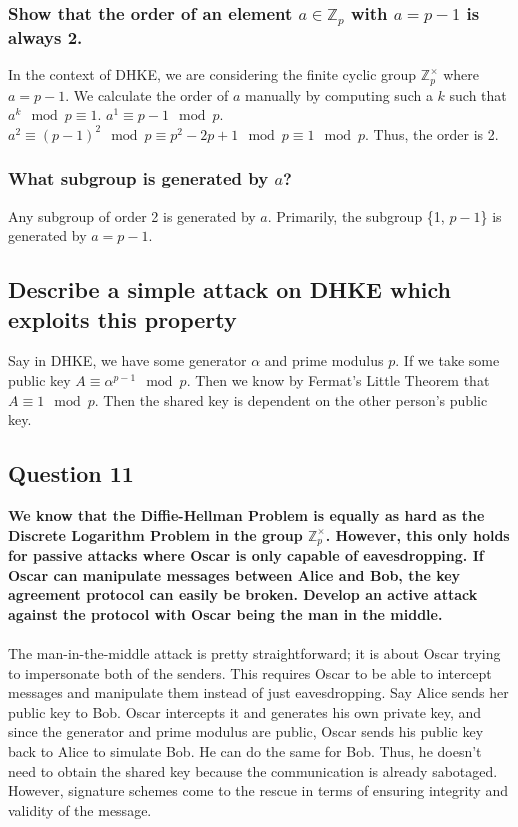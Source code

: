 \documentclass[titlepage]{article}
\begin{document}
{{\subsubsection{Show that the order of an element \(a \in \mathbb{Z}_p\) with \(a = p - 1\) is always 2.}
{
In the context of DHKE, we are considering the finite cyclic group \(\mathbb{Z}_p^{\times}\) where \(a = p -1\). We calculate the order of \(a\) manually by computing such a \(k\) such that \(a^k \mod p \equiv 1\). \(a^1 \equiv p - 1 \mod p\). \(a^2 \equiv (p - 1)^2 \mod p \equiv p^2 - 2p + 1 \mod p \equiv 1 \mod p\). Thus, the order is 2. 
}
\subsubsection{What subgroup is generated by \(a\)?}
{
Any subgroup of order 2 is generated by \(a\). Primarily, the subgroup \{1, \(p - 1\)\} is generated by \(a = p - 1\).
}
\subsection{Describe a simple attack on DHKE which exploits this property}
{
Say in DHKE, we have some generator \(\alpha\) and prime modulus \(p\). If we take some public key \(A \equiv \alpha^{p - 1} \mod p\). Then we know by Fermat's Little Theorem that \(A \equiv 1 \mod p\). Then the shared key is dependent on the other person's public key. 
}
}
\clearpage
\subsection{Question 11}
{
\textbf{We know that the Diffie-Hellman Problem is equally as hard as the Discrete Logarithm Problem in the group \(\mathbb{Z}_{p}^{\times}\). However, this only holds for passive attacks where Oscar is only capable of eavesdropping. If Oscar can manipulate messages between Alice and Bob, the key agreement protocol can easily be broken. Develop an active attack against the protocol with Oscar being the man in the middle.}\\\\
The man-in-the-middle attack is pretty straightforward; it is about Oscar trying to impersonate both of the senders. This requires Oscar to be able to intercept messages and manipulate them instead of just eavesdropping. Say Alice sends her public key to Bob. Oscar intercepts it and generates his own private key, and since the generator and prime modulus are public, Oscar sends his public key back to Alice to simulate Bob. He can do the same for Bob. Thus, he doesn't need to obtain the shared key because the communication is already sabotaged. However, signature schemes come to the rescue in terms of ensuring integrity and validity of the message.
}
}
\end{document}
